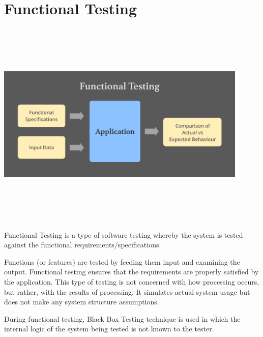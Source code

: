 \section{Functional Testing}
\begin{center}
    \includegraphics[width=12cm,height=10cm,keepaspectratio]{images/Functional-Testing-feature-image}
\end{center}
Functional Testing is a type of software testing whereby the system is tested 
against the functional requirements/specifications.
\par
\bigskip
Functions (or features) are tested by feeding them input and examining the 
output. Functional testing ensures that the requirements are properly satisfied 
by the application. This type of testing is not concerned with how processing 
occurs, but rather, with the results of processing. It simulates actual system 
usage but does not make any system structure assumptions.
\par
\bigskip
During functional testing, Black Box Testing technique is used in which the 
internal logic of the system being tested is not known to the tester.

